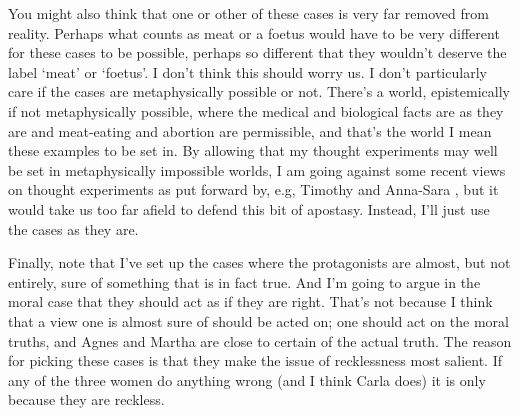 You might also think that one or other of these cases is very far removed from reality. Perhaps what counts as meat or a foetus would have to be very different for these cases to be possible, perhaps so different that they wouldn't deserve the label `meat' or `foetus'. I don't think this should worry us. I don't particularly care if the cases are metaphysically possible or not. There's a world, epistemically if not metaphysically possible, where the medical and biological facts are as they are and meat-eating and abortion are permissible, and that's the world I mean these examples to be set in. By allowing that my thought experiments may well be set in metaphysically impossible worlds, I am going against some recent views on thought experiments as put forward by, e.g, Timothy  \citet{Williamson2007-WILTPO-17} and Anna-Sara  \citet{Malmgren2011}, but it would take us too far afield to defend this bit of apostasy. Instead, I'll just use the cases as they are.

Finally, note that I've set up the cases where the protagonists are almost, but not entirely, sure of something that is in fact true. And I'm going to argue in the moral case that they should act as if they are right. That's not because I think that a view one is almost sure of should be acted on; one should act on the moral truths, and Agnes and Martha are close to certain of the actual truth. The reason for picking these cases is that they make the issue of recklessness most salient. If any of the three women do anything wrong (and I think Carla does) it is only because they are reckless.

